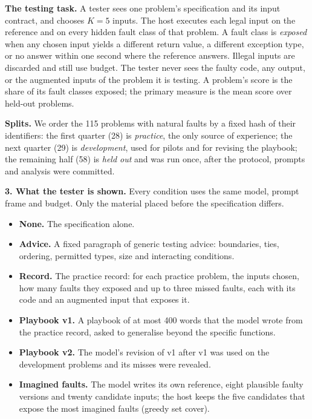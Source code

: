 \documentclass[11pt]{article}
\begin{document}
\textbf{The testing task.} A tester sees one problem's specification and its input
contract, and chooses $K=5$ inputs. The host executes each legal input on the
reference and on every hidden fault class of that problem. A fault class is
\emph{exposed} when any chosen input yields a different return value, a
different exception type, or no answer within one second where the reference answers. Illegal inputs are discarded and still use budget. The
tester never sees the faulty code, any output, or the augmented inputs of the
problem it is testing. A problem's score is the share of its fault classes
exposed; the primary measure is the mean score over held-out problems.

\textbf{Splits.} We order the 115 problems with natural faults by a fixed hash of
their identifiers: the first quarter (28) is \emph{practice}, the only source of
experience; the next quarter (29) is \emph{development}, used for pilots and for
revising the playbook; the remaining half (58) is \emph{held out} and was run once,
after the protocol, prompts and analysis were committed.

\hypertarget{conditions}{}
\textbf{3. What the tester is shown.}
Every condition uses the same model, prompt frame and budget. Only the material
placed before the specification differs.

\begin{itemize}
\item \textbf{None.} The specification alone.
\item \textbf{Advice.} A fixed paragraph of generic testing advice: boundaries,
ties, ordering, permitted types, size and interacting conditions.
\item \textbf{Record.} The practice record: for each practice problem, the inputs
chosen, how many faults they exposed and up to three missed faults, each with
its code and an augmented input that exposes it.
\item \textbf{Playbook v1.} A playbook of at most 400 words that the model wrote
from the practice record, asked to generalise beyond the specific functions.
\item \textbf{Playbook v2.} The model's revision of v1 after v1 was used on the
development problems and its misses were revealed.
\item \textbf{Imagined faults.} The model writes its own reference, eight
plausible faulty versions and twenty candidate inputs; the host keeps the five
candidates that expose the most imagined faults (greedy set cover).
\end{itemize}
\end{document}
